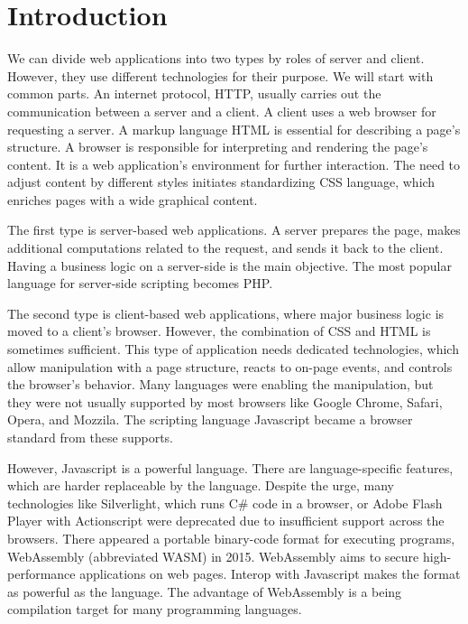 \chapter*{Introduction}

We can divide web applications into two types by roles of server and client.
However, they use different technologies for their purpose.
We will start with common parts.
An internet protocol, HTTP, usually carries out the communication between a server and a client.
A client uses a web browser for requesting a server.
A markup language HTML is essential for describing a page's structure.
A browser is responsible for interpreting and rendering the page's content.
It is a web application's environment for further interaction.
The need to adjust content by different styles initiates standardizing CSS language, which enriches pages with a wide graphical content.
\par
The first type is server-based web applications.
A server prepares the page, makes additional computations related to the request, and sends it back to the client.
Having a business logic on a server-side is the main objective.
The most popular language for server-side scripting becomes PHP.
\par
The second type is client-based web applications, where major business logic is moved to a client's browser.
However, the combination of CSS and HTML is sometimes sufficient.
This type of application needs dedicated technologies, which allow manipulation with a page structure, reacts to on-page events, and controls the browser's behavior.
Many languages were enabling the manipulation, but they were not usually supported by most browsers like Google Chrome, Safari, Opera, and Mozzila.
The scripting language Javascript became a browser standard from these supports.
\par
However, Javascript is a powerful language.
There are language-specific features, which are harder replaceable by the language.
Despite the urge, many technologies like Silverlight, which runs C\# code in a browser, or Adobe Flash Player with Actionscript were deprecated due to insufficient support across the browsers.
There appeared a portable binary-code format for executing programs, WebAssembly (abbreviated WASM)  in 2015.
WebAssembly aims to secure high-performance applications on web pages.
Interop with Javascript makes the format as powerful as the language.
The advantage of WebAssembly is a being compilation target for many programming languages.
